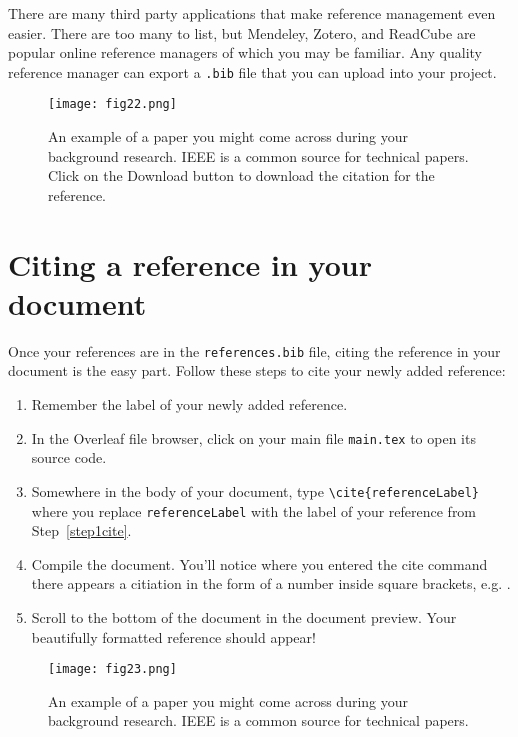 \documentclass[10pt]{article}
\begin{document}
There are many third party applications that make reference management even easier. There are too many to list, but Mendeley, Zotero, and ReadCube are popular online reference managers of which you may be familiar. Any quality reference manager can export a \lstinline{.bib} file that you can upload into your project.
\begin{figure}
\begin{center}
\texttt{[image: fig22.png]}
\end{center}
\caption{An example of a paper you might come across during your background research. IEEE is a common source for technical papers. Click on the Download button to download the citation for the reference.}
\label{fig:2}
\end{figure}

\section{Citing a reference in your document}
Once your references are in the \lstinline{references.bib} file, citing the reference in your document is the easy part. Follow these steps to cite your newly added reference:
\begin{enumerate}
\item\label{step1cite} Remember the label of your newly added reference. 
\item In the Overleaf file browser, click on your main file \lstinline{main.tex} to open its source code.
\item Somewhere in the body of your document, type \lstinline!\cite{referenceLabel}! where you replace \lstinline{referenceLabel} with the label of your reference from Step~\ref{step1cite}.
\item Compile the document. You’ll notice where you entered the cite command there appears a citiation in the form of a number inside square brackets, e.g. \cite{lefeber2001observer}. 
\item Scroll to the bottom of the document in the document preview. Your beautifully formatted reference should appear!
\end{enumerate}

\begin{figure}
\begin{center}
\texttt{[image: fig23.png]}
\end{center}
\caption{An example of a paper you might come across during your background research. IEEE is a common source for technical papers.}
\label{fig:3}
\end{figure}
\end{document}
